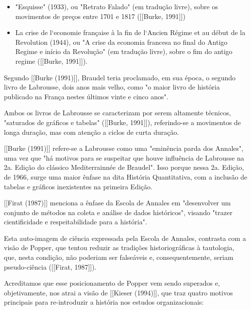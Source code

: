 \begin{itemize}
\item "Esquisse" (1933), ou "Retrato Falado" (em tradução livre), sobre os movimentos de preços entre 1701 e 1817  ([[Burke, 1991]])
\item La crise de l`economie française à la fin de l`Ancien Régime et au début de la Revolution (1944), ou "A crise da economia francesa no final do Antigo Regime e início da Revolução" (em tradução livre), sobre o fim do antigo regime  ([[Burke, 1991]]).
\end{itemize}

Segundo  [[Burke (1991)]], Braudel teria proclamado, em sua época, o segundo livro de Labrousse, dois anos mais velho, como "o maior livro de história publicado na França nestes últimos vinte e cinco anos".

Ambos os livros de Labrousse se caracterizam por serem altamente técnicos, "saturados de gráficos e tabelas"  ([[Burke, 1991]]), referindo-se a movimentos de longa duração, mas com atenção a ciclos de curta duração.

[[Burke (1991)]] refere-se a Labrousse como uma "eminência parda dos Annales", uma vez que "há motivos para se suspeitar que houve influência de Labrousse na 2a. Edição do clássico Mediterrainnée de Braudel". Isso porque nessa 2a. Edição, de 1966, surge uma maior ênfase na dita História Quantitativa, com a inclusão de tabelas e gráficos inexistentes na primeira Edição.

 [[Firat (1987)]] menciona a ênfase da Escola de Annales em "desenvolver um conjunto de métodos na coleta e análise de dados históricos", visando "trazer cientificidade e respeitabilidade para a história".

Esta auto-imagem de ciência expressada pela Escola de Annales, contrasta com a visão de Popper, que tentou reduzir as tradições historiográficas à tautologia, que, nesta condição, não poderiam ser falseáveis e, consequentemente, seriam pseudo-ciência  ([[Firat, 1987]]).

Acreditamos que esse posicionamento de Popper vem sendo superados e, objetivamente, nos atrai a visão de  [[Kieser (1994)]], que traz quatro motivos principais para re-introduzir a história nos estudos organizacionais:


